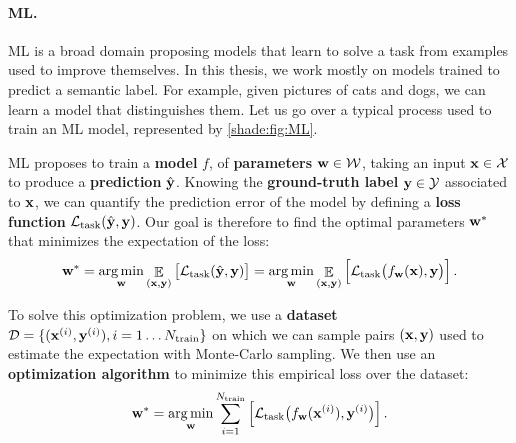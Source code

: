 \paragraph{\acf{ML}.} \ac{ML} is a broad domain proposing models that learn to solve a task from examples used to improve themselves. In this thesis, we work mostly on models trained to predict a semantic label. For example, given pictures of cats and dogs, we can learn a model that distinguishes them. Let us go over a typical process used to train an \ac{ML} model, represented by \autoref{shade:fig:ML}.

\ac{ML} proposes to train a \textbf{model} $f$, of \textbf{parameters} $\mathbf{w} \in \mathcal{W}$, taking an input $\mathbf{x}\in\mathcal{X}$ to produce a \textbf{prediction} $\hat{\mathbf{y}}$. Knowing the \textbf{ground-truth label} $\mathbf{y} \in \mathcal{Y}$ associated to $\mathbf{x}$, we can quantify the prediction error of the model by defining a \textbf{loss function} $\mathcal{L}_\mathrm{task}(\hat{\mathbf{y}}, \mathbf{y})$. Our goal is therefore to find the optimal parameters $\mathbf{w}^*$ that minimizes the expectation of the loss:
\begin{equation}
	\vw^* = \argmin_\vw \EE_{(\vx, \vy)} \big[\mcL_\mathrm{task}(\vyh, \vy) \big]
  = \argmin_\vw \EE_{(\vx, \vy)} \Big[\mcL_\mathrm{task}\big(f_\vw(\vx), \vy\big) \Big] \,.
\end{equation}

To solve this optimization problem, we use a \textbf{dataset} $\mathcal{D}=\{(\mathbf{x}^{(i)}, \mathbf{y}^{(i)}), i = 1\dots N_\mathrm{train}\}$ on which we can sample pairs $(\mathbf{x}, \mathbf{y})$ used to estimate the expectation with Monte-Carlo sampling. We then use an \textbf{optimization algorithm} to minimize this empirical loss over the dataset:
\begin{equation}\label{shade:eq:trainnoreg}
	\vw^* = \argmin_\vw \sum_{i=1}^{N_\mathrm{train}} \Big[\mcL_\mathrm{task}\big(f_\vw(\vx^{(i)}), \vy^{(i)}\big) \Big] \,.
\end{equation}

 
